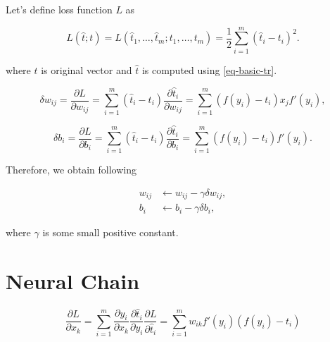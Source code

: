 \documentclass{article}
\numberwithin{equation}{section}
\theoremstyle{definition}
\theoremstyle{remark}
\begin{document}
Let's define loss function $L$ as

\begin{equation}\label{eq-basic-loss}
    L(\hat{t};t) = L(\hat{t}_1,\dots,\hat{t}_m;t_1,\dots,t_m) = \frac{1}{2}\sum_{i=1}^{m} \left( \hat{t}_i - t_i \right)^2.
\end{equation}

where $t$ is original vector and $\hat{t}$ is computed using \eqref{eq-basic-tr}.

\[
    \delta w_{ij} =  \frac{\partial L}{\partial w_{ij}} = 
    \sum_{i=1}^{m} \left( \hat{t}_i - t_i \right) \frac{\partial \hat{t}_{i}}{\partial w_{ij}} =
    \sum_{i=1}^{m} \left( f(y_{i}) - t_i \right)  x_{j} f'(y_{i}),
\]

\[
    \delta b_{i} =\frac{\partial L}{\partial b_{i}} = \sum_{i=1}^{m} \left( \hat{t}_i - t_i \right) \frac{\partial \hat{t}_{i}}{\partial b_{i}} =
     \sum_{i=1}^{m} \left( f(y_{i}) - t_i \right) f'(y_{i}).
\]

Therefore, we obtain following

\begin{align}
    w_{ij} &\leftarrow w_{ij} - \gamma \delta w_{ij}, \\
    b_{i} & \leftarrow b_{i} - \gamma \delta b_{i},
\end{align}

where $\gamma$ is some small positive constant.

\section{Neural Chain}

\[
    \frac{\partial L}{\partial x_{k}} = 
    \sum_{i=1}^{m}
        \frac{\partial y_{i}}{\partial x_{k}}
        \frac{\partial \hat{t}_{i}}{\partial y_{i}}
        \frac{\partial L}{\partial \hat{t}_{i}} = 
    \sum_{i=1}^{m}
        w_{ik} f'(y_{i}) \left(  f(y_{i}) - t_i \right)
\]
\end{document}
